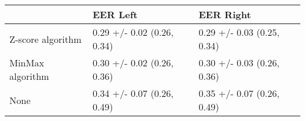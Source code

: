 \begin{tabular}{lll}
\toprule
{} &                    EER Left &                   EER Right \\
\midrule
Z-score algorithm &  0.29 +/- 0.02 (0.26, 0.34) &  0.29 +/- 0.03 (0.25, 0.34) \\
MinMax algorithm  &  0.30 +/- 0.02 (0.26, 0.36) &  0.30 +/- 0.03 (0.26, 0.36) \\
None              &  0.34 +/- 0.07 (0.26, 0.49) &  0.35 +/- 0.07 (0.26, 0.49) \\
\bottomrule
\end{tabular}
